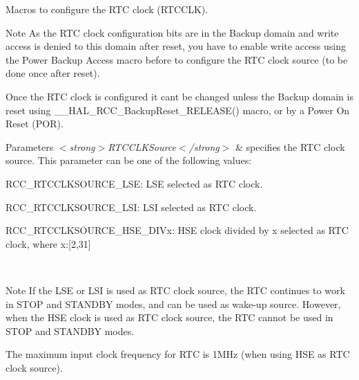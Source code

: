 Macros to configure the R\+TC clock (R\+T\+C\+C\+LK). 

\begin{DoxyNote}{Note}
As the R\+TC clock configuration bits are in the Backup domain and write access is denied to this domain after reset, you have to enable write access using the Power Backup Access macro before to configure the R\+TC clock source (to be done once after reset). 

Once the R\+TC clock is configured it can\textquotesingle{}t be changed unless the Backup domain is reset using \+\_\+\+\_\+\+H\+A\+L\+\_\+\+R\+C\+C\+\_\+\+Backup\+Reset\+\_\+\+R\+E\+L\+E\+A\+S\+E() macro, or by a Power On Reset (P\+OR). 
\end{DoxyNote}

\begin{DoxyParams}{Parameters}
{\em $<$strong$>$\+R\+T\+C\+C\+L\+K\+Source$<$/strong$>$} & specifies the R\+TC clock source. This parameter can be one of the following values\+: \begin{DoxyItemize}
\item R\+C\+C\+\_\+\+R\+T\+C\+C\+L\+K\+S\+O\+U\+R\+C\+E\+\_\+\+L\+SE\+: L\+SE selected as R\+TC clock. \item R\+C\+C\+\_\+\+R\+T\+C\+C\+L\+K\+S\+O\+U\+R\+C\+E\+\_\+\+L\+SI\+: L\+SI selected as R\+TC clock. \item R\+C\+C\+\_\+\+R\+T\+C\+C\+L\+K\+S\+O\+U\+R\+C\+E\+\_\+\+H\+S\+E\+\_\+\+D\+I\+Vx\+: H\+SE clock divided by x selected as R\+TC clock, where x\+:\mbox{[}2,31\mbox{]} \end{DoxyItemize}
\\
\hline
\end{DoxyParams}
\begin{DoxyNote}{Note}
If the L\+SE or L\+SI is used as R\+TC clock source, the R\+TC continues to work in S\+T\+OP and S\+T\+A\+N\+D\+BY modes, and can be used as wake-\/up source. However, when the H\+SE clock is used as R\+TC clock source, the R\+TC cannot be used in S\+T\+OP and S\+T\+A\+N\+D\+BY modes. 

The maximum input clock frequency for R\+TC is 1\+M\+Hz (when using H\+SE as R\+TC clock source). 
\end{DoxyNote}

